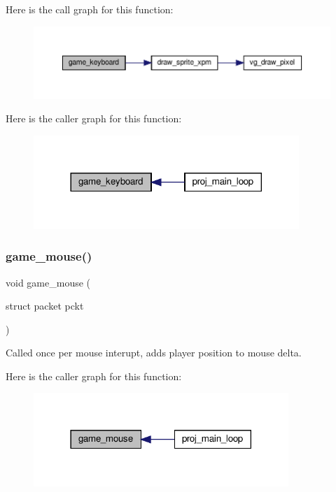 Here is the call graph for this function\+:\nopagebreak
\begin{figure}[H]
\begin{center}
\leavevmode
\includegraphics[width=350pt]{group__Game_ga51812b928d0d9e7b80bc06c044e7f5ce_cgraph}
\end{center}
\end{figure}
Here is the caller graph for this function\+:\nopagebreak
\begin{figure}[H]
\begin{center}
\leavevmode
\includegraphics[width=284pt]{group__Game_ga51812b928d0d9e7b80bc06c044e7f5ce_icgraph}
\end{center}
\end{figure}
\mbox{\label{group__Game_ga096eca75e6305cefa8171bda34e5ae42}} 
\subsubsection{\texorpdfstring{game\+\_\+mouse()}{game\_mouse()}}
{\footnotesize\ttfamily void game\+\_\+mouse (\begin{DoxyParamCaption}\item[{struct packet}]{pckt }\end{DoxyParamCaption})}



Called once per mouse interupt, adds player position to mouse delta. 

Here is the caller graph for this function\+:\nopagebreak
\begin{figure}[H]
\begin{center}
\leavevmode
\includegraphics[width=273pt]{group__Game_ga096eca75e6305cefa8171bda34e5ae42_icgraph}
\end{center}
\end{figure}


